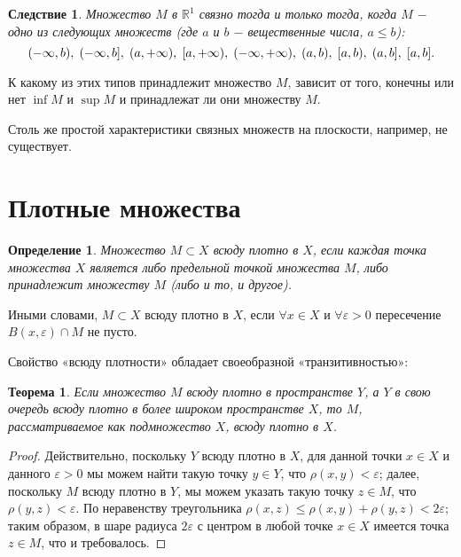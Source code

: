 \documentclass{article}
\newtheorem{theorem}{Теорема}[section]
\newtheorem{definition}{Определение}[section]
\newtheorem*{consequence}{Следствие}
\begin{document}
\begin{consequence}
Множество \(M\) в \(\mathbb{R}^1\) связно тогда и только тогда, когда \(M\) \(-\) одно из следующих множеств (где \(a\) и \(b\) \(-\) вещественные числа, \(a \leq b\)):
\[
(-\infty, b), \hspace{1mm} (-\infty, b], \hspace{1mm} (a, +\infty), \hspace{1mm} [a, +\infty), \hspace{1mm} (-\infty, +\infty), \hspace{1mm} (a, b), \hspace{1mm} [a, b), \hspace{1mm} (a, b], \hspace{1mm} [a, b].
\]
\end{consequence}

К какому из этих типов принадлежит множество \(M\), зависит от того, конечны или нет \(\inf M\) и \(\sup M\) и принадлежат ли они множеству \(M\).

Столь же простой характеристики связных множеств на плоскости, например, не существует.

\section{Плотные множества}

\begin{definition}
Множество \(M \subset X\) всюду плотно в \(X\), если каждая точка множества \(X\) является либо предельной точкой множества \(M\), либо принадлежит множеству \(M\) (либо и то, и другое).
\end{definition}

Иными словами, \(M \subset X\) всюду плотно в \(X\), если \(\forall x \in X\) и \(\forall \varepsilon > 0\) пересечение \(B(x, \varepsilon) \cap M\) не пусто.

Свойство «всюду плотности» обладает своеобразной «транзитивностью»:

\begin{theorem}
Если множество \(M\) всюду плотно в пространстве \(Y\), а \(Y\) в свою очередь всюду плотно в более широком пространстве \(X\), то \(M\), рассматриваемое как подмножество \(X\), всюду плотно в \(X\).
\end{theorem}

\begin{proof}
Действительно, поскольку \(Y\) всюду плотно в \(X\), для данной точки \(x \in X\) и данного \(\varepsilon > 0\) мы можем найти такую точку \(y \in Y\), что \(\rho(x, y) < \varepsilon\); далее, поскольку \(M\) всюду плотно в \(Y\), мы можем указать такую точку \(z \in M\), что \(\rho(y, z) < \varepsilon\). По неравенству треугольника \(\rho(x, z) \leq \rho(x, y) + \rho(y, z) < 2\varepsilon\); таким образом, в шаре радиуса \(2\varepsilon\) с центром в любой точке \(x \in X\) имеется точка \(z \in M\), что и требовалось.
\end{proof}
\end{document}

